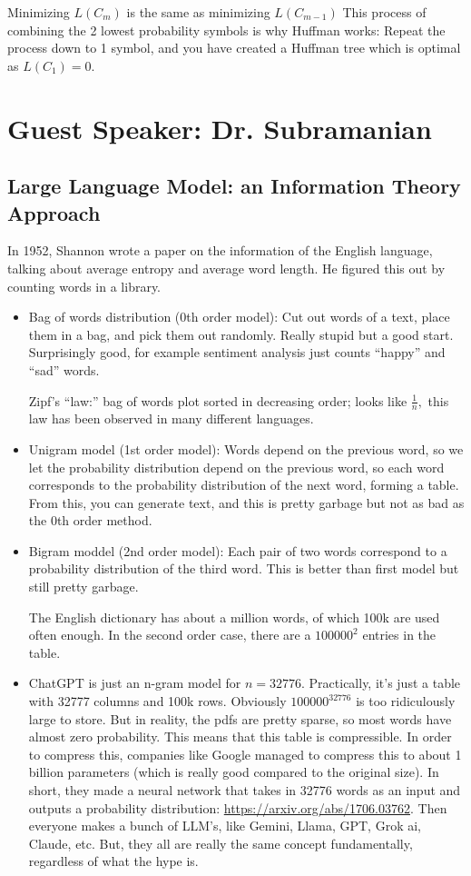 \documentclass[12pt]{article}
\begin{document}
Minimizing $L(C_m)$ is the same as minimizing $L(C_{m-1})$ This process of combining the 2 lowest probability symbols is why Huffman works: Repeat the process down to 1 symbol, and you have created a Huffman tree which is optimal as $L(C_1) = 0$.

\section{Guest Speaker: Dr. Subramanian}
\subsection{Large Language Model: an Information Theory Approach}
In 1952, Shannon wrote a paper on the information of the English language, talking about average entropy and average word length. He figured this out by counting words in a library.
\begin{itemize}
\item Bag of words distribution (0th order model):
Cut out words of a text, place them in a bag, and pick them out randomly. Really stupid but a good start. Surprisingly good, for example sentiment analysis just counts ``happy'' and ``sad'' words. 

Zipf's ``law:'' bag of words plot sorted in decreasing order; looks like $\frac{1}{n},$ this law has been observed in many different languages.

\item Unigram model (1st order model):
Words depend on the previous word, so we let the probability distribution depend on the previous word, so each word corresponds to the probability distribution of the next word, forming a table. From this, you can generate text, and this is pretty garbage but not as bad as the 0th order method.
\item Bigram moddel (2nd order model):
Each pair of two words correspond to a probability distribution of the third word. This is better than first model but still pretty garbage.

The English dictionary has about a million words, of which 100k are used often enough. In the second order case, there are a $100000^2$ entries in the table. 


\item ChatGPT is just an n-gram model for $n=32776.$ Practically, it's just a table with 32777 columns and 100k rows. Obviously $100000^{32776}$ is too ridiculously large to store. But in reality, the pdfs are pretty sparse, so most words have almost zero probability. This means that this table is compressible. In order to compress this, companies like Google managed to compress this to about 1 billion parameters (which is really good compared to the original size). In short, they made a neural network that takes in 32776 words as an input and outputs a probability distribution: \url{https://arxiv.org/abs/1706.03762}. Then everyone makes a bunch of LLM's, like Gemini, Llama, GPT, Grok ai, Claude, etc. But, they all are really the same concept fundamentally, regardless of what the hype is. 
\end{itemize}
\end{document}

